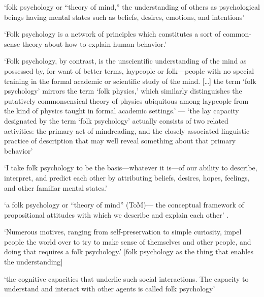 \documentclass[12pt,\papersize]{extarticle}
\begin{document}
`folk psychology or ``theory of mind,'' the understanding of others as psychological beings having mental states such as beliefs, desires, emotions, and intentions' \citep[p.~838]{meltzoff:1995_understanding}

`Folk psychology is a network of principles which constitutes a sort of common-sense theory about how to explain human behavior.' \citep[p.~197]{horgan:1985_folk}

`Folk psychology, by contrast, is the unscientific understanding of the mind as possessed by, for want of better terms, laypeople or folk---people with no special training in the formal academic or scientific study of the mind. {[}\ldots{]} the term `folk psychology' mirrors the term `folk physics,' which similarly distinguishes the putatively commonsensical theory of physics ubiquitous among laypeople from the kind of physics taught in formal academic settings.' \citep[p.~23]{hartner:2016_folk} --- `the lay capacity designated by the term `folk psychology' actually consists of two related activities: the primary act of mindreading, and the closely associated linguistic practice of description that may well reveal something about that primary behavior' \citep[p.~24]{hartner:2016_folk}

`I take folk psychology to be the basis---whatever it is---of our ability to describe, interpret, and predict each other by attributing beliefs, desires, hopes, feelings, and other familiar mental states.' \citep[p.~1]{godfrey-smith:2005_folk}

`a folk psychology or ``theory of mind'' (ToM)--- the conceptual framework of propositional attitudes with which we describe and explain each other' \citep[p.~2]{rakoczy:2015_defense}.

`Numerous motives, ranging from self-preservation to simple curiosity, impel people the world over to try to make sense of themselves and other people, and doing that requires a folk psychology.' \citep[p.~13]{flavell:2004_development} {[}folk psychology as the thing that enables the understanding{]}

`the cognitive capacities that underlie such social interactions. The capacity to understand and interact with other agents is called folk psychology' \citep[p.~1]{spaulding:2018_how}
\end{document}
